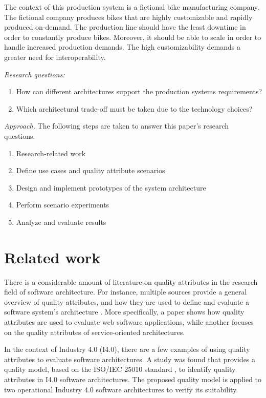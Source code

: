 \documentclass[conference]{IEEEtran}
\begin{document}
The context of this production system is a fictional bike manufacturing company. The fictional company produces bikes that are highly customizable and rapidly produced on-demand. The production line should have the least downtime in order to constantly produce bikes. Moreover, it should be able to scale in order to handle increased production demands. The high customizability demands a greater need for interoperability.    
  
\emph{Research questions:}
\begin{enumerate}
    \item  How can different architectures support the production systems requirements?
    \item  Which architectural trade-off must be taken due to the technology choices?
\end{enumerate}


\emph{Approach.}
The following steps are taken to answer this paper's research questions: 
\begin{enumerate}
    \item Research-related work
    \item Define use cases and quality attribute scenarios
    \item Design and implement prototypes of the system architecture
    \item Perform scenario experiments
    \item Analyze and evaluate results
\end{enumerate}

\section{Related work}
\label{sec:related_work}

There is a considerable amount of literature on quality attributes in the research field of software architecture. For instance, multiple sources provide a general overview of quality attributes, and how they are used to define and evaluate a software system’s architecture \cite{barbacci_quality_1995}\cite{bass2012software}. More specifically, a paper \cite{offutt_quality_2002} shows how quality attributes are used to evaluate web software applications, while another \cite{obrien_quality_2007} focuses on the quality attributes of service-oriented architectures.

In the context of Industry 4.0 (I4.0), there are a few examples of using quality attributes to evaluate software architectures. A study\cite{antonino_quality_2022} was found that provides a quality model, based on the ISO/IEC 25010 standard \cite{noauthor_isoiec_2011}, to identify quality attributes in I4.0 software architectures. The proposed quality model is applied to two operational Industry 4.0 software architectures to verify its suitability.
\end{document}
